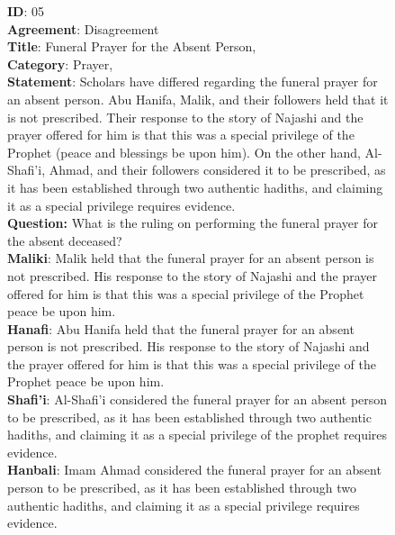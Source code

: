 \documentclass[letterpaper]{article}
\begin{document}
\begin{figure}
    \centering
    \small
     \begin{tcolorbox}[colback=black!10, boxrule=0pt]
     {
\textbf{ID}: 05\\
\textbf{Agreement}: Disagreement\\
\textbf{Title}: Funeral Prayer for the Absent Person,\\
\textbf{Category}: Prayer,\\
\textbf{Statement}: Scholars have differed regarding the funeral prayer for an absent person. Abu Hanifa, Malik, and their followers held that it is not prescribed. Their response to the story of Najashi and the prayer offered for him is that this was a special privilege of the Prophet (peace and blessings be upon him). On the other hand, Al-Shafi'i, Ahmad, and their followers considered it to be prescribed, as it has been established through two authentic hadiths, and claiming it as a special privilege requires evidence.\\
\textbf{Question:} What is the ruling on performing the funeral prayer for the absent deceased?\\
\textbf{Maliki}: Malik held that the funeral prayer for an absent person is not prescribed. His response to the story of Najashi and the prayer offered for him is that this was a special privilege of the Prophet peace be upon him.\\
\textbf{Hanafi}: Abu Hanifa held that the funeral prayer for an absent person is not prescribed. His response to the story of Najashi and the prayer offered for him is that this was a special privilege of the Prophet peace be upon him.\\
\textbf{Shafi'i}: Al-Shafi'i considered the funeral prayer for an absent person to be prescribed, as it has been established through two authentic hadiths, and claiming it as a special privilege of the prophet requires evidence.\\
\textbf{Hanbali}: Imam Ahmad considered the funeral prayer for an absent person to be prescribed, as it has been established through two authentic hadiths, and claiming it as a special privilege requires evidence.


}
\end{tcolorbox}
\end{figure}
\end{document}
